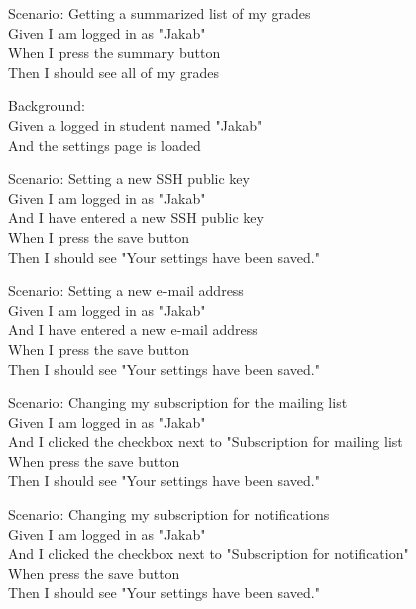 Scenario: Getting a summarized list of my grades\\ \hspace*{1cm}
Given I am logged in as "Jakab"\\ \hspace*{1cm}
When I press the summary button\\ \hspace*{1cm}
Then I should see all of my grades

Background:\\ \hspace*{1cm}
Given a logged in student named "Jakab"\\ \hspace*{1cm}
And the settings page is loaded

Scenario: Setting a new SSH public key\\ \hspace*{1cm}
Given I am logged in as "Jakab"\\ \hspace*{1cm}
And I have entered a new SSH public key\\ \hspace*{1cm}
When I press the save button\\ \hspace*{1cm}
Then I should see "Your settings have been saved."

Scenario: Setting a new e-mail address\\ \hspace*{1cm}
Given I am logged in as "Jakab"\\ \hspace*{1cm}
And I have entered a new e-mail address\\ \hspace*{1cm}
When I press the save button\\ \hspace*{1cm}
Then I should see "Your settings have been saved."

Scenario: Changing my subscription for the mailing list\\ \hspace*{1cm}
Given I am logged in as "Jakab"\\ \hspace*{1cm}
And I clicked the checkbox next to "Subscription for mailing list\\ \hspace*{1cm}
When press the save button\\ \hspace*{1cm}
Then I should see "Your settings have been saved."

Scenario: Changing my subscription for notifications\\ \hspace*{1cm}
Given I am logged in as "Jakab"\\ \hspace*{1cm}
And I clicked the checkbox next to "Subscription for notification"\\ \hspace*{1cm}
When press the save button\\ \hspace*{1cm}
Then I should see "Your settings have been saved."